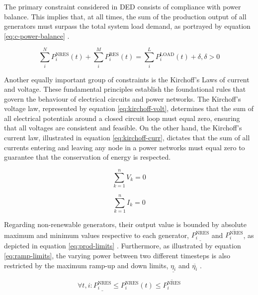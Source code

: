 The primary constraint considered in \ac{DED} consists of compliance with power balance. This implies that, at all times, the sum of the production output of all generators must surpass the total system load demand, as portrayed by equation \ref{eq:c-power-balance} \cite{chenScalableGraphReinforcement2023, liNovelGraphReinforcement2022, leiDynamicEnergyDispatch2021}. 

\begin{equation} \label{eq:c-power-balance}
	\sum^N_i P^\text{NRES}_i(t) + \sum^M_i P^\text{RES}_i(t) = \sum^L_i P^\text{LOAD}_i(t) + \delta, \delta > 0
\end{equation}

Another equally important group of constraints is the Kirchoff's Laws of current and voltage. These fundamental principles establish the foundational rules that govern the behaviour of electrical circuits and power networks. The Kirchoff's voltage law, represented by equation \ref{eq:kirchoff-volt}, determines that the sum of all electrical potentials around a closed circuit loop must equal zero, ensuring that all voltages are consistent and feasible. On the other hand, the Kirchoff's current law, illustrated in equation \ref{eq:kirchoff-curr}, dictates that the sum of all currents entering and leaving any node in a power networks must equal zero to guarantee that the conservation of energy is respected. 

\begin{equation} \label{eq:kirchoff-volt}
	\sum_{k=1}^n  V_k = 0
\end{equation}

\begin{equation} \label{eq:kirchoff-curr}
	\sum_{k=1}^n  I_k = 0
\end{equation}


Regarding non-renewable generators, their output value is bounded by absolute maximum and minimum values respective to each generator, $\underline{P^\text{NRES}_i}$ and $\overline{P^\text{NRES}_i}$, as depicted in equation \ref{eq:prod-limits} \cite{chenScalableGraphReinforcement2023, liNovelGraphReinforcement2022, liuDistributedEconomicDispatch2018}. Furthermore, as illustrated by equation \ref{eq:ramp-limits}, the varying power between two different timesteps is also restricted by the maximum ramp-up and down limits, $\underline{\eta_i }$ and $\overline{\eta_i }$ \cite{chenScalableGraphReinforcement2023, liNovelGraphReinforcement2022}. \par

\begin{equation} \label{eq:prod-limits}
	\forall t, i: \underline{P^\text{NRES}_i} \leq P^\text{NRES}_i(t) \leq \overline{P^\text{NRES}_i}
\end{equation}

